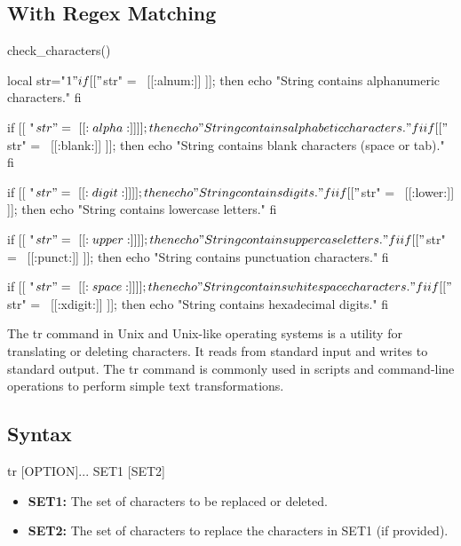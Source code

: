 \documentclass{report}
\begin{document}
    \subsection{With Regex Matching}
    \bigbreak \noindent 
    \begin{bashcode}
        check_characters() {
            local str="$1"

            if [[ "$str" =~ [[:alnum:]] ]]; then
            echo "String contains alphanumeric characters."
            fi

            if [[ "$str" =~ [[:alpha:]] ]]; then
            echo "String contains alphabetic characters."
            fi

            if [[ "$str" =~ [[:blank:]] ]]; then
            echo "String contains blank characters (space or tab)."
            fi

            if [[ "$str" =~ [[:digit:]] ]]; then
            echo "String contains digits."
            fi

            if [[ "$str" =~ [[:lower:]] ]]; then
            echo "String contains lowercase letters."
            fi

            if [[ "$str" =~ [[:upper:]] ]]; then
            echo "String contains uppercase letters."
            fi

            if [[ "$str" =~ [[:punct:]] ]]; then
            echo "String contains punctuation characters."
            fi

            if [[ "$str" =~ [[:space:]] ]]; then
            echo "String contains whitespace characters."
            fi

            if [[ "$str" =~ [[:xdigit:]] ]]; then
            echo "String contains hexadecimal digits."
            fi
        }
    \end{bashcode}
    \bigbreak \noindent 

    \pagebreak 
    \bigbreak \noindent 
    The tr command in Unix and Unix-like operating systems is a utility for translating or deleting characters. It reads from standard input and writes to standard output. The tr command is commonly used in scripts and command-line operations to perform simple text transformations.
    \bigbreak \noindent 
    \subsection{Syntax}
    \bigbreak \noindent 
    \begin{bashcode}
    tr [OPTION]... SET1 [SET2]
    \end{bashcode}
    \bigbreak \noindent 
    \begin{itemize}
        \item \textbf{SET1:} The set of characters to be replaced or deleted.
        \item \textbf{SET2:} The set of characters to replace the characters in SET1 (if provided).
    \end{itemize}
    \bigbreak \noindent 
\end{document}
